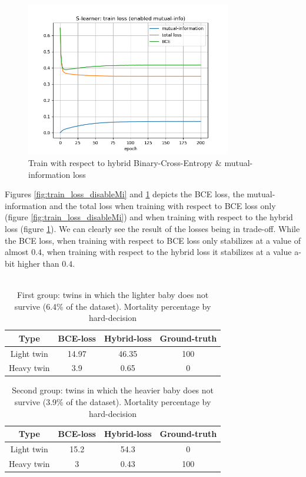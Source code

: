 \documentclass[oneside,12pt]{article}
\begin{document}
%
\begin{figure}
    \centering
        \includegraphics[width=0.8\textwidth]{./train_loss_enableMi}
        \caption{\label{fig:train_loss_enableMi}Train with respect to hybrid Binary-Cross-Entropy & mutual-information loss}
\end{figure}
%
Figures \ref{fig:train_loss_disableMi} and \ref{fig:train_loss_enableMi} depicts the BCE loss, the mutual-information and the total loss when training with respect to BCE loss only (figure \ref{fig:train_loss_disableMi}) and when training with respect to the hybrid loss (figure \ref{fig:train_loss_enableMi}). We can clearly see the result of the losses being in trade-off. While the BCE loss, when training with respect to BCE loss only stabilizes at a value of almost $0.4$, when training with respect to the hybrid loss it stabilizes at a value a-bit higher than $0.4$.\\\\
%
%
\begin{table}[t]
\centering
 \begin{tabular}{||c | c | c | c ||}
 \hline
 Type & BCE-loss & Hybrid-loss & Ground-truth \\ [0.5ex] 
 \hline\hline
 Light twin & 14.97 & 46.35 & 100 \\ 
 \hline
 Heavy twin & 3.9 & 0.65 & 0 \\ [1ex]
 \hline
\end{tabular}
\caption{First group: twins in which the lighter baby does not survive (6.4\% of the dataset). Mortality percentage by hard-decision}
\label{tab:mort1}
\end{table}
%
%
\begin{table}[t]
\centering
 \begin{tabular}{||c | c | c | c ||}
 \hline
 Type & BCE-loss & Hybrid-loss & Ground-truth \\ [0.5ex] 
 \hline\hline
 Light twin & 15.2 & 54.3 & 0 \\ 
 \hline
 Heavy twin & 3 & 0.43 & 100 \\ [1ex]
 \hline
\end{tabular}
\caption{Second group: twins in which the heavier baby does not survive (3.9\% of the dataset). Mortality percentage by hard-decision}
\label{tab:mort2}
\end{table}
\end{document}

